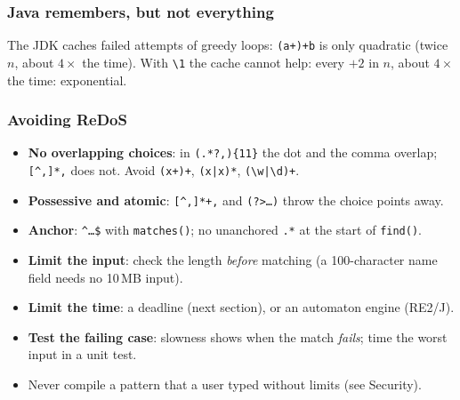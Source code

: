 \documentclass[aspectratio=169,10pt,compress]{beamer}
\begin{document}
\begin{frame}[t,fragile] \frametitle{Java remembers, but not everything}

  \vspace{0.2em}
  \small The JDK caches failed attempts of greedy loops: \texttt{(a+)+b} is only quadratic (twice $n$, about $4\times$ the time). With \texttt{\textbackslash 1} the cache cannot help: every $+2$ in $n$, about $4\times$ the time: exponential.
\end{frame}




\begin{frame}[t,fragile] \frametitle{Avoiding ReDoS}
  \begin{itemize}\small
    \item \textbf{No overlapping choices}: in \texttt{(.*?,)\{11\}} the dot and the comma overlap; \texttt{[\textasciicircum ,]*,} does not. Avoid \texttt{(x+)+}, \texttt{(x|x)*}, \texttt{(\textbackslash w|\textbackslash d)+}.
    \item \textbf{Possessive and atomic}: \texttt{[\textasciicircum ,]*+,} and \texttt{(?>\dots)} throw the choice points away.
    \item \textbf{Anchor}: \texttt{\textasciicircum\dots\$} with \texttt{matches()}; no unanchored \texttt{.*} at the start of \texttt{find()}.
    \item \textbf{Limit the input}: check the length \emph{before} matching (a 100-character name field needs no 10\,MB input).
    \item \textbf{Limit the time}: a deadline (next section), or an automaton engine (RE2/J).
    \item \textbf{Test the failing case}: slowness shows when the match \emph{fails}; time the worst input in a unit test.
    \item Never compile a pattern that a user typed without limits (see Security).
  \end{itemize}
\end{frame}

\end{document}
